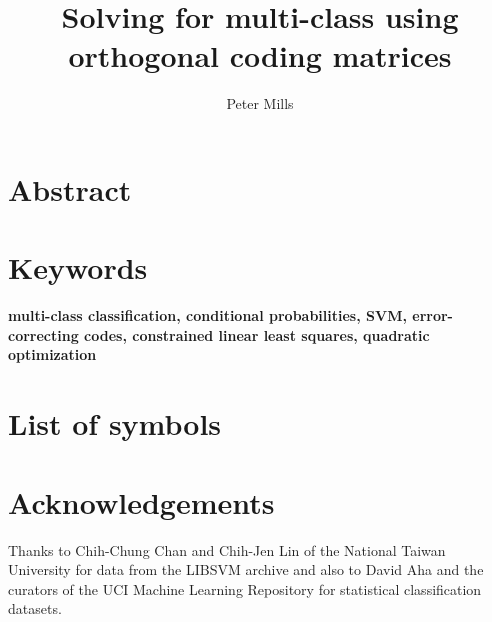 \documentclass{article}
\title{Solving for multi-class using orthogonal coding matrices}
\author{Peter Mills}
\begin{document}
\maketitle

\section*{Abstract}



\section*{Keywords}
\textbf{multi-class classification, 
	conditional probabilities,
	SVM,
	error-correcting codes,
	constrained linear least squares,
	quadratic optimization}

\tableofcontents

\section*{List of symbols}





\appendix

\section*{Acknowledgements}

Thanks to Chih-Chung Chan and Chih-Jen Lin of the National Taiwan University
for data from the LIBSVM archive and also to David Aha and the curators of
the UCI Machine Learning Repository for statistical classification datasets.

\newpage
{}

\end{document}
